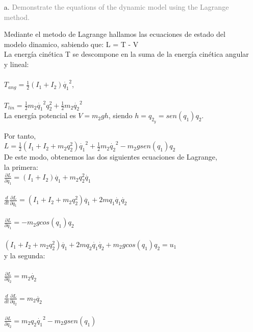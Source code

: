 \documentclass{article}
\begin{document}
\begin{itemize}

\item[a.] 
\textcolor{gray}{Demonstrate the equations of the dynamic model using the Lagrange method.}

\bigskip

Mediante el metodo de Lagrange hallamos las ecuaciones de estado del modelo dinamico, sabiendo que: L = T - V\\

La energía cinética T se descompone en la suma de la energía cinética angular y lineal:\\\\
$T_{ang} = \frac{1}{2}(I_1 + I_2)\dot{q_1}^2$,\\\\

$T_{lin} = \frac{1}{2}m_2\dot{q_1}^2q_2^2 + \frac{1}{2}m_2\dot{q_2}^2$\\

La energía potencial es $V = m_2gh$, siendo $h = q_2_y = sen(q_1)q_2$.

Por tanto,\\

$L = \frac{1}{2}(I_1 + I_2 + m_2q_2^2)\dot{q_1}^2 + \frac{1}{2}m_2\dot{q_2}^2 - m_2gsen(q_1)q_2$\\

De este modo, obtenemos las dos siguientes ecuaciones de Lagrange,\\
la primera:\\

		$\frac{\partial L}{\partial \dot{q_1}} = (I_1 + I_2)\dot{q_1} + m_2q_2^2\dot{q_1}$\\\\
		$\frac{d}{dt}\frac{\partial L}{\partial \dot{q_1}} = (I_1 + I_2 + m_2q_2^2)\ddot{q_1} + 2mq_1\dot{q_1}\dot{q_2}$\\\\
		$\frac{\partial L}{\partial q_1} = -m_2gcos(q_1)q_2$\\\\
		
		$(I_1 + I_2 + m_2q_2^2)\ddot{q_1} + 2mq_2\dot{q_1}\dot{q_2} + m_2gcos(q_1)q_2 = u_1$\\
		
y la segunda:\\\\
		$\frac{\partial L}{\partial \dot{q_2}} = m_2\dot{q_2}$\\\\
		$\frac{d}{dt}\frac{\partial L}{\partial \dot{q_2}} = m_2\ddot{q_2}$\\\\
		$\frac{\partial L}{\partial q_2} = m_2q_2\dot{q_1}^2 - m_2gsen(q_1)$\\\\
		

\end{itemize}
\end{document}
